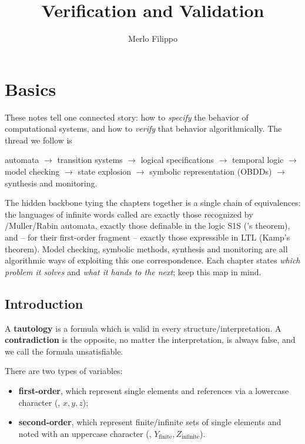 \documentclass[oneside]{academica}
\title{Verification and Validation}
\author{Merlo Filippo}
\begin{document}
\frontmatter

\maketitle

\tableofcontents

\mainmatter

\chapter{Basics}

\begin{note}
  These notes tell one connected story: how to \emph{specify} the behavior of computational systems, and how to \emph{verify} that behavior algorithmically. The thread we follow is
  \begin{center}
    automata $\to$ transition systems $\to$ logical specifications $\to$ temporal logic $\to$ model checking $\to$ state explosion $\to$ symbolic representation (OBDDs) $\to$ synthesis and monitoring.
  \end{center}
  The hidden backbone tying the chapters together is a single chain of equivalences: the languages of infinite words called \wreg are exactly those recognized by \Buchi/Muller/Rabin automata, exactly those definable in the logic S1S (\Buchi's theorem), and -- for their first-order fragment -- exactly those expressible in LTL (Kamp's theorem). Model checking, symbolic methods, synthesis and monitoring are all algorithmic ways of exploiting this one correspondence. Each chapter states \emph{which problem it solves} and \emph{what it hands to the next}; keep this map in mind.
\end{note}

\section{Introduction}

A \textbf{tautology} is a formula which is valid in every structure/interpretation. A \textbf{contradiction} is the opposite, no matter the interpretation, is always false, and we call the formula unsatisfiable.

There are two types of variables:
\begin{itemize}
  \item \textbf{first-order}, which represent single elements and references via a lowercase character (\eg, $x,y,z$);
  \item \textbf{second-order}, which represent finite/infinite sets of single elements and noted with an uppercase character (\eg, $Y_\text{finite}, Z_\text{infinite}$).
\end{itemize}
\end{document}
